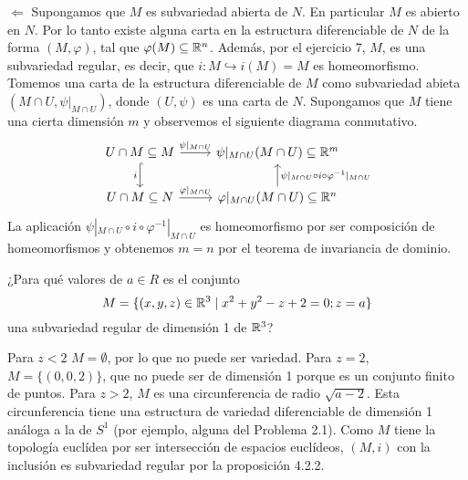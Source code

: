 \documentclass[twoside]{article}
\newcounter{ejercicio}
\begin{document}
\begin{solucion}
$\boxed{\Leftarrow}$ Supongamos que $M$ es subvariedad abierta de $N$. En particular $M$ es abierto en $N$. Por lo tanto existe alguna carta en la estructura diferenciable de $N$ de la forma $(M, \varphi)$, tal que $\varphi(M)\subseteq\mathbb{R}^n$. Además, por el ejercicio 7, $M$, es una subvariedad regular, es decir, que $i:M\hookrightarrow i(M)=M$ es homeomorfismo. Tomemos una carta de la estructura diferenciable de $M$ como subvariedad abieta $(M\cap U,\psi|_{M\cap U})$, donde $(U,\psi)$ es una carta de $N$. Supongamos que $M$ tiene una cierta dimensión $m$ y observemos el siguiente diagrama conmutativo.
\[
\begin{tikzcd}
U\cap M\subseteq M\arrow[r,"\psi|_{M\cap U}"]\arrow[d,hookrightarrow, "i"'] & \psi|_{M\cap U}(M\cap U)\subseteq \R^m\\
U\cap M\subseteq N\arrow[r,"\varphi|_{M\cap U}"] & \varphi|_{M\cap U}(M\cap U)\subseteq\R^n\arrow[u, "\psi|_{M\cap U}\circ i\circ\varphi^{-1}|_{M\cap U}"']
\end{tikzcd}
\]
La aplicación $\psi|_{M\cap U}\circ i\circ\varphi^{-1}|_{M\cap U}$ es homeomorfismo por ser composición de homeomorfismos y obtenemos $m=n$ por el teorema de invariancia de dominio.
\end{solucion}

\newpage

\begin{ejercicio}{15}
¿Para qué valores de $a \in R$ es el conjunto
$$M = \{(x, y, z) \in \mathbb{R}^3\mid x^2 + y^2 - z + 2 = 0; z = a\}$$
una subvariedad regular de dimensión 1 de $\mathbb{R}^3$?
\end{ejercicio}
\begin{solucion}
Para $z<2$ $M=\emptyset$, por lo que no puede ser variedad. Para $z=2$, $M=\{(0,0,2)\}$, que no puede ser de dimensión 1 porque es un conjunto finito de puntos. Para $z>2$, $M$ es una circunferencia de radio $\sqrt{a-2}$. Esta circunferencia tiene una estructura de variedad diferenciable de dimensión 1 análoga a la de $S^1$ (por ejemplo, alguna del Problema 2.1). Como $M$ tiene la topología euclídea por ser intersección de espacios euclídeos, $(M,i)$ con la inclusión es subvariedad regular por la proposición 4.2.2.
\end{solucion}
\end{document}
